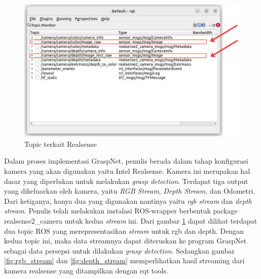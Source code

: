 \begin{figure} [H] \centering
    \includegraphics[scale=0.6]{gambar/topic realsense anotated.png}
    \caption{Topic terkait Realsense}
    \label{fig:realsense_topic}
  \end{figure}
  Dalam proses implementasi GraspNet, penulis berada dalam tahap konfigurasi kamera yang akan digunakan yaitu Intel Realsense.
  Kamera ini merupakan hal dasar yang diperlukan untuk melakukan \emph{grasp detection}. Terdapat tiga output yang dikeluarkan oleh kamera,
  yaitu \emph{RGB Stream}, \emph{Depth Stream}, dan Odometri. Dari ketiganya, hanya dua yang digunakan nantinya yaitu \emph{rgb stream}
  dan \emph{depth stream}. Penulis telah melakukan instalasi ROS-wrapper berbentuk package realsense2\_camera untuk kedua \emph{stream} ini.
Dari gambar \ref{fig:realsense_topic} dapat dilihat terdapat dua topic ROS yang merepresentasikan \emph{stream} untuk rgb dan depth. Dengan kedua topic ini,
maka data streamnya dapat diteruskan ke program GraspNet sebagai data persepsi untuk dilakukan \emph{grasp detection}. Sedangkan gambar \ref{fig:rgb_stream}
dan \ref{fig:depth_stream} memperlihatkan hasil streaming dari kamera realsense yang ditampilkan dengan rqt tools.


